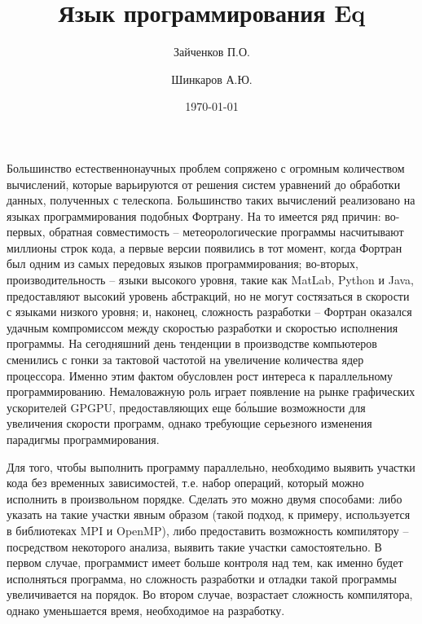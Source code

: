 \documentclass[a4paper]{llncs}
\author{Зайченков П.О.\inst{1} \and Шинкаров А.Ю.\inst{2}}
\date{\today}
\title{Язык программирования Eq}
\institute{
  Московский физико-технический институт,
  Кафедра информатики и вычислительной техники
\and
  University of Hertfordshire,
  Hatfield, Hertfordshire,
  AL10 9AB, United Kingdom
}
\begin{document}
\maketitle

Большинство естественнонаучных проблем сопряжено с огромным
количеством вычислений, которые варьируются от решения систем
уравнений до обработки данных, полученных с телескопа.  Большинство
таких вычислений реализовано на языках программирования подобных
Фортрану.  На то имеется ряд причин: во-первых, обратная совместимость
-- метеорологические программы насчитывают миллионы строк кода, а
первые версии появились в тот момент, когда Фортран был одним из самых
передовых языков программирования; во-вторых, производительность --
языки высокого уровня, такие как MatLab, Python и Java, предоставляют
высокий уровень абстракций, но не могут состязаться в скорости с
языками низкого уровня; и, наконец, сложность разработки -- Фортран
оказался удачным компромиссом между скоростью разработки и скоростью
исполнения программы.  На сегодняшний день тенденции в производстве
компьютеров сменились с гонки за тактовой частотой на увеличение
количества ядер процессора.  Именно этим фактом обусловлен рост
интереса к параллельному программированию.  Немаловажную роль играет
появление на рынке графических ускорителей GPGPU, предоставляющих еще
б\'{о}льшие возможности для увеличения скорости программ, однако
требующие серьезного изменения парадигмы программирования.  

Для того, чтобы выполнить программу параллельно, необходимо выявить
участки кода без временных зависимостей, т.е. набор операций, который
можно исполнить в произвольном порядке.  Сделать это можно двумя
способами: либо указать на такие участки явным образом (такой подход,
к примеру, используется в библиотеках MPI и OpenMP), либо предоставить
возможность компилятору -- посредством некоторого анализа, выявить
такие участки самостоятельно.  В первом случае, программист имеет
больше контроля над тем, как именно будет исполняться программа, но
сложность разработки и отладки такой программы увеличивается на
порядок.  Во втором случае, возрастает сложность компилятора, однако
уменьшается время, необходимое на разработку.  
\end{document}
